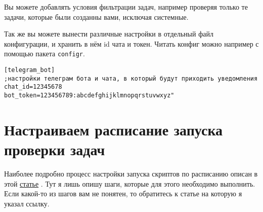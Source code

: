 \documentclass[
]{book}
\newenvironment{Shaded}{\begin{snugshade}}{\end{snugshade}}
\newcommand{\AttributeTok}[1]{\textcolor[rgb]{0.77,0.63,0.00}{#1}}
\newcommand{\CommentTok}[1]{\textcolor[rgb]{0.56,0.35,0.01}{\textit{#1}}}
\newcommand{\ConstantTok}[1]{\textcolor[rgb]{0.00,0.00,0.00}{#1}}
\newcommand{\FunctionTok}[1]{\textcolor[rgb]{0.00,0.00,0.00}{#1}}
\newcommand{\NormalTok}[1]{#1}
\newcommand{\OtherTok}[1]{\textcolor[rgb]{0.56,0.35,0.01}{#1}}
\newcommand{\SpecialCharTok}[1]{\textcolor[rgb]{0.00,0.00,0.00}{#1}}
\newcommand{\StringTok}[1]{\textcolor[rgb]{0.31,0.60,0.02}{#1}}
\begin{document}
Вы можете добавлять условия фильтрации задач, например проверяя только те задачи, которые были созданны вами, исключая системные.

Так же вы можете вынести различные настройки в отдельный файл конфигурации, и хранить в нём id чата и токен. Читать конфиг можно например с помощью пакета \texttt{configr}.

\begin{verbatim}
[telegram_bot]
;настройки телеграм бота и чата, в который будут приходить уведомления
chat_id=12345678
bot_token=123456789:abcdefghijklmnopqrstuvwxyz"
\end{verbatim}

\begin{Shaded}
\end{Shaded}

\hypertarget{ux43dux430ux441ux442ux440ux430ux438ux432ux430ux435ux43c-ux440ux430ux441ux43fux438ux441ux430ux43dux438ux435-ux437ux430ux43fux443ux441ux43aux430-ux43fux440ux43eux432ux435ux440ux43aux438-ux437ux430ux434ux430ux447}{%
\section{Настраиваем расписание запуска проверки задач}\label{ux43dux430ux441ux442ux440ux430ux438ux432ux430ux435ux43c-ux440ux430ux441ux43fux438ux441ux430ux43dux438ux435-ux437ux430ux43fux443ux441ux43aux430-ux43fux440ux43eux432ux435ux440ux43aux438-ux437ux430ux434ux430ux447}}

Наиболее подробно процесс настройки запуска скриптов по расписанию описан в этой \href{https://netpeak.net/ru/blog/kak-nastroit-zapusk-r-skripta-po-raspisaniyu/}{статье} . Тут я лишь опишу шаги, которые для этого необходимо выполнить. Если какой-то из шагов вам не понятен, то обратитесь к статье на которую я указал ссылку.
\end{document}
